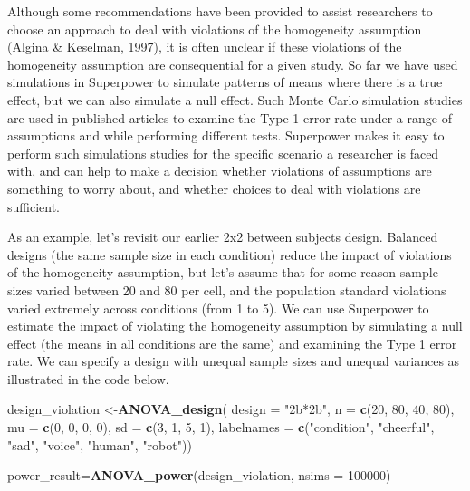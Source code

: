 \documentclass[
  ,jou,floatsintext]{apa6}
\newenvironment{Shaded}{\begin{snugshade}}{\end{snugshade}}
\newcommand{\DataTypeTok}[1]{\textcolor[rgb]{0.13,0.29,0.53}{#1}}
\newcommand{\DecValTok}[1]{\textcolor[rgb]{0.00,0.00,0.81}{#1}}
\newcommand{\KeywordTok}[1]{\textcolor[rgb]{0.13,0.29,0.53}{\textbf{#1}}}
\newcommand{\NormalTok}[1]{#1}
\newcommand{\StringTok}[1]{\textcolor[rgb]{0.31,0.60,0.02}{#1}}
\begin{document}
Although some recommendations have been provided to assist researchers to choose an approach to deal with violations of the homogeneity assumption (Algina \& Keselman, 1997), it is often unclear if these violations of the homogeneity assumption are consequential for a given study.
So far we have used simulations in Superpower to simulate patterns of means where there is a true effect, but we can also simulate a null effect.
Such Monte Carlo simulation studies are used in published articles to examine the Type 1 error rate under a range of assumptions and while performing different tests.
Superpower makes it easy to perform such simulations studies for the specific scenario a researcher is faced with, and can help to make a decision whether violations of assumptions are something to worry about, and whether choices to deal with violations are sufficient.

As an example, let's revisit our earlier 2x2 between subjects design.
Balanced designs (the same sample size in each condition) reduce the impact of violations of the homogeneity assumption, but let's assume that for some reason sample sizes varied between 20 and 80 per cell, and the population standard violations varied extremely across conditions (from 1 to 5).
We can use Superpower to estimate the impact of violating the homogeneity assumption by simulating a null effect (the means in all conditions are the same) and examining the Type 1 error rate.
We can specify a design with unequal sample sizes and unequal variances as illustrated in the code below.

\begin{Shaded}
\begin{Highlighting}[]
\NormalTok{design_violation <-}\KeywordTok{ANOVA_design}\NormalTok{(}
 \DataTypeTok{design =} \StringTok{"2b*2b"}\NormalTok{, }\DataTypeTok{n =} \KeywordTok{c}\NormalTok{(}\DecValTok{20}\NormalTok{, }\DecValTok{80}\NormalTok{, }\DecValTok{40}\NormalTok{, }\DecValTok{80}\NormalTok{), }
 \DataTypeTok{mu =} \KeywordTok{c}\NormalTok{(}\DecValTok{0}\NormalTok{, }\DecValTok{0}\NormalTok{, }\DecValTok{0}\NormalTok{, }\DecValTok{0}\NormalTok{), }\DataTypeTok{sd =} \KeywordTok{c}\NormalTok{(}\DecValTok{3}\NormalTok{, }\DecValTok{1}\NormalTok{, }\DecValTok{5}\NormalTok{, }\DecValTok{1}\NormalTok{),}
 \DataTypeTok{labelnames =} \KeywordTok{c}\NormalTok{(}\StringTok{"condition"}\NormalTok{, }
                \StringTok{"cheerful"}\NormalTok{, }\StringTok{"sad"}\NormalTok{,}
                \StringTok{"voice"}\NormalTok{, }
                \StringTok{"human"}\NormalTok{, }\StringTok{"robot"}\NormalTok{))}

\NormalTok{power_result=}\KeywordTok{ANOVA_power}\NormalTok{(design_violation,}
                         \DataTypeTok{nsims =} \DecValTok{100000}\NormalTok{)}
\end{Highlighting}
\end{Shaded}
\end{document}
